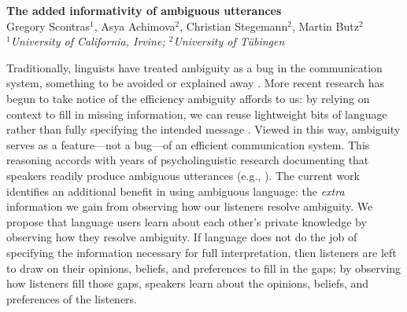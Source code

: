 \documentclass[12pt]{article}
\begin{document}
\setlength{\abovedisplayskip}{0.5pt}
\setlength{\belowdisplayskip}{0.5pt}


\begin{center}
	\textbf{The added informativity of ambiguous utterances}\\[5pt]
	{\small Gregory Scontras$^1$, Asya Achimova$^2$, Christian Stegemann$^2$, Martin Butz$^2$\\[2pt]
	\emph{$^1$University of California, Irvine; $^2$University of T\"{u}bingen}}
\end{center}

\vspace{-5pt}

\noindent 
Traditionally, linguists have treated ambiguity as a bug in the communication system, something to be avoided or explained away \citep{grice1975,chomsky2002minimalism}.
More recent research has begun to take notice of the efficiency ambiguity affords to us: by relying on context to fill in missing information, we can reuse lightweight bits of language rather than fully specifying the intended message \citep{levinson2000,piantadosietal2012,wasow2015}. 
Viewed in this way, ambiguity serves as a feature---not a bug---of an efficient communication system.
This reasoning accords with years of psycholinguistic research documenting that speakers readily produce ambiguous utterances (e.g., \citealp{ferreira2008}). The current work identifies an additional benefit in using ambiguous language: the \emph{extra} information we gain from observing how our listeners resolve ambiguity.
We propose that language users learn about each other's private knowledge by observing how they resolve ambiguity. If language does not do the job of specifying the information necessary for full interpretation, then listeners are left to draw on their opinions, beliefs, and preferences to fill in the gaps; by observing how listeners fill those gaps, speakers learn about the opinions, beliefs, and preferences of the listeners.
\end{document}

